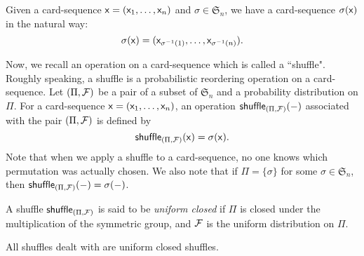 Given a card-sequence  $\mathsf{x}=(\mathsf{x}_1,\ldots,\mathsf{x}_n)$ and $\sigma\in\mathfrak{S}_n$, we have a card-sequence $\sigma(\mathsf{x})$ in the natural way:
\[ \sigma(\mathsf{x})=(\mathsf{x}_{\sigma^{-1}(1)},\ldots, \mathsf{x}_{\sigma^{-1}(n)}).\]

Now, we recall an operation on a card-sequence which is called a ``shuffle".
Roughly speaking, a shuffle is a probabilistic reordering operation on a card-sequence. 
Let $(\Pi,\mathcal{F})$ be a pair of a subset of $\mathfrak{S}_n$ and a probability distribution on $\Pi$. 
For a card-sequence $\mathsf{x}=(\mathsf{x}_1,\ldots,\mathsf{x}_n)$, an operation $\mathsf{shuffle}_{(\Pi,\mathcal{F})}(-)$ associated with the pair $(\Pi,\mathcal{F})$ is defined by
\[ \mathsf{shuffle}_{(\Pi,\mathcal{F})}(\mathsf{x})= \sigma(\mathsf{x}).  \]
Note that when we apply a shuffle to a card-sequence, no one knows which permutation was actually chosen.
We also note that if $\Pi=\{\sigma\}$ for some $\sigma\in\mathfrak{S}_{n}$, then $ \mathsf{shuffle}_{(\Pi,\mathcal{F})}(-)=\sigma(-)$. 

\begin{definition}\label{def:ucshuffle}
A shuffle $\mathsf{shuffle}_{(\Pi,\mathcal{F})}$ is said to be \textit{uniform closed} if $\Pi$ is closed under the multiplication of the symmetric group, and $\mathcal{F}$ is the uniform distribution on $\Pi$. 
\end{definition}

All shuffles dealt with  are uniform closed shuffles. 

